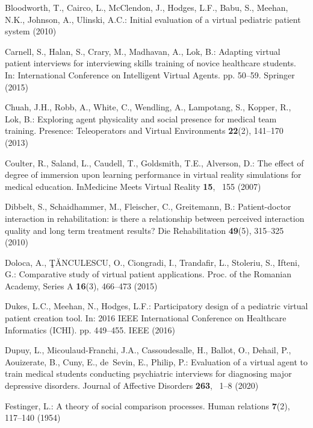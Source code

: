 \documentclass[runningheads]{llncs}
\begin{document}
\begin{thebibliography}{10}
Bloodworth, T., Cairco, L., McClendon, J., Hodges, L.F., Babu, S., Meehan,
  N.K., Johnson, A., Ulinski, A.C.: Initial evaluation of a virtual pediatric
  patient system  (2010)

Carnell, S., Halan, S., Crary, M., Madhavan, A., Lok, B.: Adapting virtual
  patient interviews for interviewing skills training of novice healthcare
  students. In: International Conference on Intelligent Virtual Agents. pp.
  50--59. Springer (2015)

Chuah, J.H., Robb, A., White, C., Wendling, A., Lampotang, S., Kopper, R., Lok,
  B.: Exploring agent physicality and social presence for medical team
  training. Presence: Teleoperators and Virtual Environments  \textbf{22}(2),
  141--170 (2013)

Coulter, R., Saland, L., Caudell, T., Goldsmith, T.E., Alverson, D.: The effect
  of degree of immersion upon learning performance in virtual reality
  simulations for medical education. InMedicine Meets Virtual Reality
  \textbf{15}, ~155 (2007)

Dibbelt, S., Schaidhammer, M., Fleischer, C., Greitemann, B.: Patient-doctor
  interaction in rehabilitation: is there a relationship between perceived
  interaction quality and long term treatment results? Die Rehabilitation
  \textbf{49}(5),  315--325 (2010)

Doloca, A., {\c{T}}{\u{A}}NCULESCU, O., Ciongradi, I., Trandafir, L., Stoleriu,
  S., Ifteni, G.: Comparative study of virtual patient applications. Proc. of
  the Romanian Academy, Series A  \textbf{16}(3),  466--473 (2015)

Dukes, L.C., Meehan, N., Hodges, L.F.: Participatory design of a pediatric
  virtual patient creation tool. In: 2016 IEEE International Conference on
  Healthcare Informatics (ICHI). pp. 449--455. IEEE (2016)

Dupuy, L., Micoulaud-Franchi, J.A., Cassoudesalle, H., Ballot, O., Dehail, P.,
  Aouizerate, B., Cuny, E., de~Sevin, E., Philip, P.: Evaluation of a virtual
  agent to train medical students conducting psychiatric interviews for
  diagnosing major depressive disorders. Journal of Affective Disorders
  \textbf{263}, ~1--8 (2020)

Festinger, L.: A theory of social comparison processes. Human relations
  \textbf{7}(2),  117--140 (1954)


\end{thebibliography}
\end{document}
